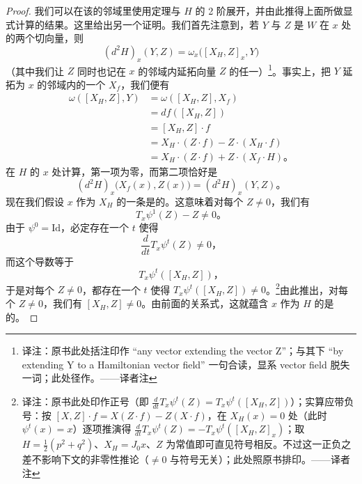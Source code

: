 \begin{proof}
我们可以在该\trCriticalPoint{}的邻域里使用\trDarboux{}定理与 $H$ 的 2 阶\trTaylor{}展开，并由此推得上面所做显式计算的结果。这里给出另一个证明。我们首先注意到，若 $Y$ 与 $Z$ 是 $W$ 在 $x$ 处的两个切向量，则
\[
(d^2H)_x(Y,Z)=\omega_x\bigl([X_H,Z]_x,Y\bigr)
\]
（其中我们让 $Z$ 同时也记在 $x$ 的邻域内延拓向量 $Z$ 的任一\trVectorField）\footnote{译注：原书此处括注印作 “any vector extending the vector Z”；与其下 “by extending Y to a Hamiltonian vector field” 一句合读，显系 vector field 脱失一词；此处径作\trVectorField。——译者注}。事实上，把 $Y$ 延拓为 $x$ 的邻域内的一个\trHamiltonian\trVectorField{} $X_f$，我们便有
\[
\begin{aligned}
\omega([X_H,Z],Y)&=\omega([X_H,Z],X_f)\\
&=df([X_H,Z])\\
&=[X_H,Z]\cdot f\\
&=X_H\cdot(Z\cdot f)-Z\cdot(X_H\cdot f)\\
&=X_H\cdot(Z\cdot f)+Z\cdot(X_f\cdot H)\text{。}
\end{aligned}
\]
在 $H$ 的\trCriticalPoint{} $x$ 处计算，第一项为零，而第二项恰好是
\[
(d^2H)_x\bigl(X_f(x),Z(x)\bigr)=(d^2H)_x(Y,Z)\text{。}
\]
现在我们假设 $x$ 作为 $X_H$ 的一条\trTrajectory{}是\trNondegenerate{}的。这意味着对每个 $Z\neq 0$，我们有
\[
T_x\psi^1(Z)-Z\neq 0\text{。}
\]
由于 $\psi^0=\mathrm{Id}$，必定存在一个 $t$ 使得
\[
\frac{d}{dt}T_x\psi^t(Z)\neq 0\text{，}
\]
而这个导数等于
\[
T_x\psi^t([X_H,Z])\text{，}
\]
于是对每个 $Z\neq 0$，都存在一个 $t$ 使得 $T_x\psi^t([X_H,Z])\neq 0$。\footnote{译注：原书此处印作正号（即 $\frac{d}{dt}T_x\psi^t(Z)=T_x\psi^t([X_H,Z])$）；实算应带负号：按 $[X,Z]\cdot f=X(Z\cdot f)-Z(X\cdot f)$，在 $X_H(x)=0$ 处（此时 $\psi^t(x)=x$）逐项推演得 $\frac{d}{dt}T_x\psi^t(Z)=-T_x\psi^t([X_H,Z]_x)$；取 $H=\frac{1}{2}(p^2+q^2)$、$X_H=J_0x$、$Z$ 为常值\trVectorField{}即可直见符号相反。不过这一正负之差不影响下文的非零性推论（$\neq 0$ 与符号无关）；此处照原书排印。——译者注}由此推出，对每个 $Z\neq 0$，我们有 $[X_H,Z]\neq 0$。由前面的关系式，这就蕴含 $x$ 作为 $H$ 的\trCriticalPoint{}是\trNondegenerate{}的。
\end{proof}


